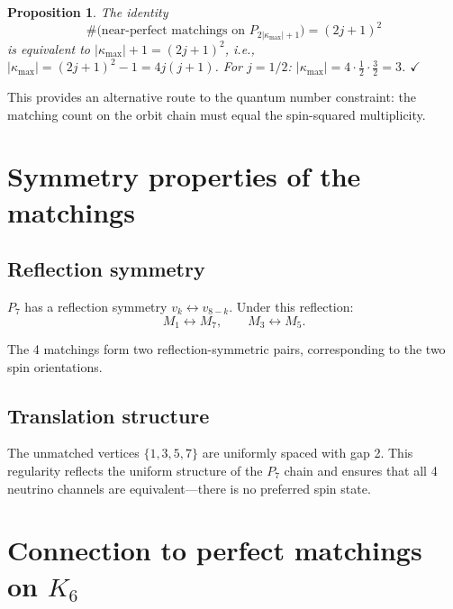 \documentclass[11pt,letterpaper]{article}
\newtheorem{proposition}[theorem]{Proposition}
\numberwithin{equation}{section}
\begin{document}
\begin{proposition}
The identity
\begin{equation}
\label{eq:matching_spin}
  \#\text{(near-perfect matchings on }P_{2|\kappa_\mathrm{max}|+1}\text{)}
  = (2j+1)^2
\end{equation}
is equivalent to $|\kappa_\mathrm{max}| + 1 = (2j+1)^2$, i.e.,
$|\kappa_\mathrm{max}| = (2j+1)^2 - 1 = 4j(j+1)$.
For $j = 1/2$: $|\kappa_\mathrm{max}| = 4 \cdot \frac{1}{2} \cdot \frac{3}{2} = 3$. $\checkmark$
\end{proposition}

This provides an alternative route to the quantum number constraint:
the matching count on the orbit chain must equal the spin-squared multiplicity.

\section{Symmetry properties of the matchings}
\label{sec:symmetry}

\subsection{Reflection symmetry}

$P_7$ has a reflection symmetry $v_k \leftrightarrow v_{8-k}$. Under this
reflection:
\begin{equation}
  M_1 \leftrightarrow M_7, \qquad M_3 \leftrightarrow M_5.
\end{equation}

The 4 matchings form two reflection-symmetric pairs, corresponding to the
two spin orientations.

\subsection{Translation structure}

The unmatched vertices $\{1, 3, 5, 7\}$ are uniformly spaced with gap 2.
This regularity reflects the uniform structure of the $P_7$ chain and
ensures that all 4 neutrino channels are equivalent---there is no preferred
spin state.

\section{Connection to perfect matchings on $K_6$}
\label{sec:K6}
\end{document}
